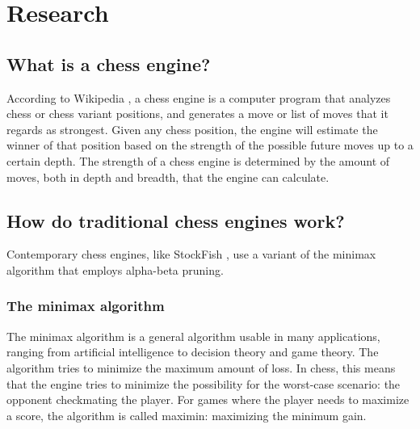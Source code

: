 \documentclass{article}
\begin{document}
\section{Research}

% 
%
%

\subsection{What is a chess engine?}

According to Wikipedia \cite{ChessEngine2022}, a chess engine is a computer program that analyzes 
chess or chess variant positions, and generates a move or list of moves that it regards as strongest.
Given any chess position, the engine will estimate the winner of that position based on the strength 
of the possible future moves up to a certain depth. The strength of a chess engine is determined by
the amount of moves, both in depth and breadth, that the engine can calculate. 


\subsection{How do traditional chess engines work?}

Contemporary chess engines, like StockFish \cite{StockfishChess2022}, use a variant of the minimax algorithm that employs alpha-beta pruning.

\subsubsection{The minimax algorithm}

The minimax algorithm \cite{Minimax2022} is a general algorithm usable in many applications, ranging from artificial intelligence to 
decision theory and game theory. The algorithm tries to minimize the maximum amount of loss. In chess, this means 
that the engine tries to minimize the possibility for the worst-case scenario: the opponent
checkmating the player. For games where the player needs to maximize a score, the algorithm is called maximin: 
maximizing the minimum gain. 
\end{document}
